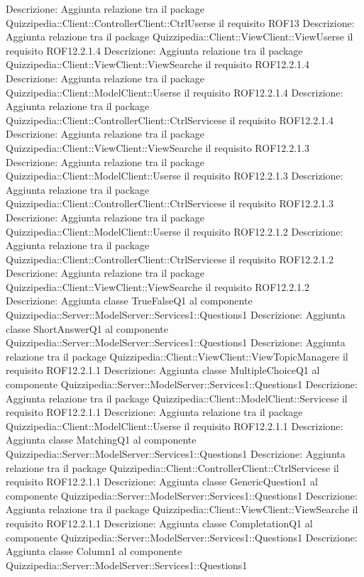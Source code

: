 Descrizione: Aggiunta relazione tra il package Quizzipedia::Client::ControllerClient::CtrlUserse il requisito ROF13 
Descrizione: Aggiunta relazione tra il package Quizzipedia::Client::ViewClient::ViewUserse il requisito ROF12.2.1.4 
Descrizione: Aggiunta relazione tra il package Quizzipedia::Client::ViewClient::ViewSearche il requisito ROF12.2.1.4 
Descrizione: Aggiunta relazione tra il package Quizzipedia::Client::ModelClient::Userse il requisito ROF12.2.1.4 
Descrizione: Aggiunta relazione tra il package Quizzipedia::Client::ControllerClient::CtrlServicese il requisito ROF12.2.1.4 
Descrizione: Aggiunta relazione tra il package Quizzipedia::Client::ViewClient::ViewSearche il requisito ROF12.2.1.3 
Descrizione: Aggiunta relazione tra il package Quizzipedia::Client::ModelClient::Userse il requisito ROF12.2.1.3 
Descrizione: Aggiunta relazione tra il package Quizzipedia::Client::ControllerClient::CtrlServicese il requisito ROF12.2.1.3 
Descrizione: Aggiunta relazione tra il package Quizzipedia::Client::ModelClient::Userse il requisito ROF12.2.1.2 
Descrizione: Aggiunta relazione tra il package Quizzipedia::Client::ControllerClient::CtrlServicese il requisito ROF12.2.1.2 
Descrizione: Aggiunta relazione tra il package Quizzipedia::Client::ViewClient::ViewSearche il requisito ROF12.2.1.2 
Descrizione: Aggiunta classe TrueFalseQ1 al componente Quizzipedia::Server::ModelServer::Services1::Questions1 
Descrizione: Aggiunta classe ShortAnswerQ1 al componente Quizzipedia::Server::ModelServer::Services1::Questions1 
Descrizione: Aggiunta relazione tra il package Quizzipedia::Client::ViewClient::ViewTopicManagere il requisito ROF12.2.1.1 
Descrizione: Aggiunta classe MultipleChoiceQ1 al componente Quizzipedia::Server::ModelServer::Services1::Questions1 
Descrizione: Aggiunta relazione tra il package Quizzipedia::Client::ModelClient::Servicese il requisito ROF12.2.1.1 
Descrizione: Aggiunta relazione tra il package Quizzipedia::Client::ModelClient::Userse il requisito ROF12.2.1.1 
Descrizione: Aggiunta classe MatchingQ1 al componente Quizzipedia::Server::ModelServer::Services1::Questions1 
Descrizione: Aggiunta relazione tra il package Quizzipedia::Client::ControllerClient::CtrlServicese il requisito ROF12.2.1.1 
Descrizione: Aggiunta classe GenericQuestion1 al componente Quizzipedia::Server::ModelServer::Services1::Questions1 
Descrizione: Aggiunta relazione tra il package Quizzipedia::Client::ViewClient::ViewSearche il requisito ROF12.2.1.1 
Descrizione: Aggiunta classe CompletationQ1 al componente Quizzipedia::Server::ModelServer::Services1::Questions1 
Descrizione: Aggiunta classe Column1 al componente Quizzipedia::Server::ModelServer::Services1::Questions1 
